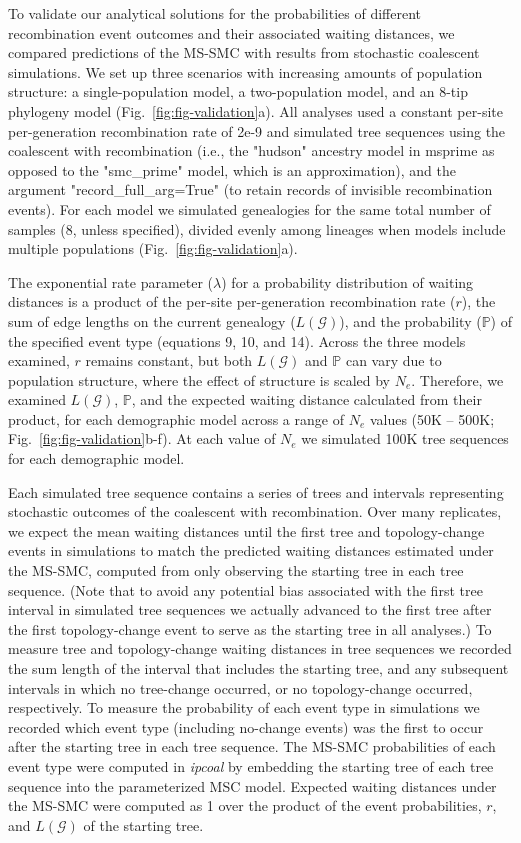 \documentclass[11pt]{article}
\begin{document}
To validate our analytical solutions for the probabilities of different 
recombination event outcomes and their associated waiting distances, 
we compared predictions of the MS-SMC with results from stochastic 
coalescent simulations. 
We set up three scenarios with increasing amounts of population structure: 
a single-population model, a two-population model, and an 8-tip phylogeny model
(Fig.~\ref{fig:fig-validation}a). 
All analyses used a constant per-site per-generation recombination rate of 
2e-9 and simulated tree sequences using the coalescent with recombination 
(i.e., the "hudson" ancestry model in msprime as opposed to the "smc\_prime" model, 
which is an approximation),
and the argument 
"record\_full\_arg=True" (to retain records of invisible recombination events). 
For each model we simulated genealogies for the same total number of samples
(8, unless specified), divided evenly among lineages when models 
include multiple populations (Fig.~\ref{fig:fig-validation}a). 


The exponential rate parameter ($\lambda$) for a probability distribution of waiting distances 
is a product of the per-site per-generation recombination rate ($r$), the sum 
of edge lengths on the current genealogy ($L(\mathcal{G})$), and the probability 
($\mathbb{P}$) of the specified event type (equations 9, 10, and 14). 
Across the three models examined, $r$ remains constant, but both $L(\mathcal{G})$ 
and $\mathbb{P}$ can vary due to population structure, where the effect of 
structure is scaled by $N_e$. 
Therefore, we examined $L(\mathcal{G})$, $\mathbb{P}$, and the expected waiting 
distance calculated from their product, for each demographic model across a range 
of $N_e$ values (50K -- 500K; Fig.~\ref{fig:fig-validation}b-f). 
At each value of $N_e$ we simulated 100K tree sequences for each
demographic model.

Each simulated tree sequence
contains a series of trees and intervals representing stochastic outcomes of
the coalescent with recombination. Over many replicates, we expect the mean
waiting distances until the first tree and topology-change events in simulations 
to match the predicted waiting distances estimated under the MS-SMC, computed
from only observing the starting tree in each tree sequence.
(Note that to avoid any potential bias associated with the first tree interval 
in simulated tree sequences we actually advanced to the first tree after the 
first topology-change event to serve as the starting tree in all analyses.) 
To measure tree and topology-change waiting distances in tree sequences we 
recorded the sum length of the interval that includes the starting tree, and any 
subsequent intervals in which no tree-change occurred, or no topology-change 
occurred, respectively. To measure the probability of each event type in simulations
we recorded which event type (including no-change events) was the first to occur 
after the starting tree in each tree sequence. 
The MS-SMC probabilities of each event type were computed in \emph{ipcoal} by 
embedding the starting tree of each tree sequence into the parameterized MSC model.
Expected waiting distances under the MS-SMC were computed as 1 over the product 
of the event probabilities, $r$, and $L(\mathcal{G})$ of the starting tree.
\end{document}
